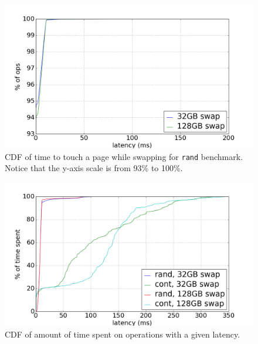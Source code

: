\documentclass[twocolumn,11pt]{article}
\begin{document}
\begin{figure}[t]
    \includegraphics[width=\columnwidth]{figures/swap_touch_time_rand_cdf}
    \caption{CDF of time to touch a page while swapping for \texttt{rand} benchmark.
    Notice that the y-axis scale is from 93\% to 100\%.\label{fig:swap_time_rand_cdf}}
\end{figure}

%

\begin{figure}[t]
    \includegraphics[width=\columnwidth]{figures/swap_time_cdf}
    \caption{CDF of amount of time spent on operations with a given
    latency.\label{fig:swap_time_cdf}}
\end{figure}
\end{document}
